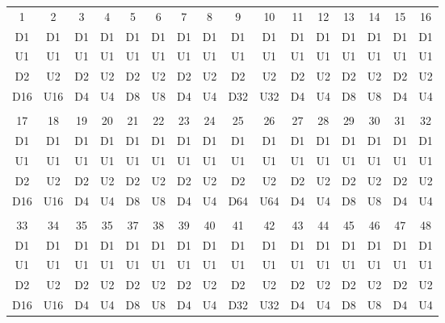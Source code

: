 \begin{table}[H]
\centering
\begin{tabular}{|c|c|c|c|c|c|c|c|c|c|c|c|c|c|c|c|}
\hline
\rowcolor[HTML]{C0C0C0} 
\multicolumn{16}{|c|}{\cellcolor[HTML]{C0C0C0}Sample}                             \\ \hline
\rowcolor[HTML]{C0C0C0} 
1   & 2   & 3  & 4  & 5  & 6  & 7  & 8  & 9   & 10  & 11 & 12 & 13 & 14 & 15 & 16 \\ \hline
D1  & D1  & D1 & D1 & D1 & D1 & D1 & D1 & D1  & D1  & D1 & D1 & D1 & D1 & D1 & D1 \\ \hline
U1  & U1  & U1 & U1 & U1 & U1 & U1 & U1 & U1  & U1  & U1 & U1 & U1 & U1 & U1 & U1 \\ \hline
D2  & U2  & D2 & U2 & D2 & U2 & D2 & U2 & D2  & U2  & D2 & U2 & D2 & U2 & D2 & U2 \\ \hline
D16 & U16 & D4 & U4 & D8 & U8 & D4 & U4 & D32 & U32 & D4 & U4 & D8 & U8 & D4 & U4 \\ \hline
\rowcolor[HTML]{C0C0C0} 
\multicolumn{16}{|c|}{\cellcolor[HTML]{C0C0C0}Sample}                             \\ \hline
\rowcolor[HTML]{C0C0C0} 
17  & 18  & 19 & 20 & 21 & 22 & 23 & 24 & 25  & 26  & 27 & 28 & 29 & 30 & 31 & 32 \\ \hline
D1  & D1  & D1 & D1 & D1 & D1 & D1 & D1 & D1  & D1  & D1 & D1 & D1 & D1 & D1 & D1 \\ \hline
U1  & U1  & U1 & U1 & U1 & U1 & U1 & U1 & U1  & U1  & U1 & U1 & U1 & U1 & U1 & U1 \\ \hline
D2  & U2  & D2 & U2 & D2 & U2 & D2 & U2 & D2  & U2  & D2 & U2 & D2 & U2 & D2 & U2 \\ \hline
D16 & U16 & D4 & U4 & D8 & U8 & D4 & U4 & D64 & U64 & D4 & U4 & D8 & U8 & D4 & U4 \\ \hline
\rowcolor[HTML]{C0C0C0} 
\multicolumn{16}{|c|}{\cellcolor[HTML]{C0C0C0}Sample}                             \\ \hline
\rowcolor[HTML]{C0C0C0} 
33  & 34  & 35 & 35 & 37 & 38 & 39 & 40 & 41  & 42  & 43 & 44 & 45 & 46 & 47 & 48 \\ \hline
D1  & D1  & D1 & D1 & D1 & D1 & D1 & D1 & D1  & D1  & D1 & D1 & D1 & D1 & D1 & D1 \\ \hline
U1  & U1  & U1 & U1 & U1 & U1 & U1 & U1 & U1  & U1  & U1 & U1 & U1 & U1 & U1 & U1 \\ \hline
D2  & U2  & D2 & U2 & D2 & U2 & D2 & U2 & D2  & U2  & D2 & U2 & D2 & U2 & D2 & U2 \\ \hline
D16 & U16 & D4 & U4 & D8 & U8 & D4 & U4 & D32 & U32 & D4 & U4 & D8 & U8 & D4 & U4 \\ \hline

\end{tabular}
\end{table}
